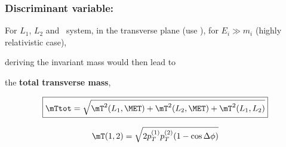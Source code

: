 \begin{frame}
\frametitle{Discriminant variable: \mTtot}
\manip For $L_1$, $L_2$ and \MET\ system,
\submanip in the transverse plane (use \MET),
\submanip for $E_i \gg m_i$ (highly relativistic case),

deriving the \og invariant \fg{} mass would then lead to
\begin{center}
the \textbf{total transverse mass}, \mTtot
\end{center}
\begin{equation*}
\boxed{\mTtot = \sqrt{\mT^2(L_1,\MET) + \mT^2(L_2,\MET) + \mT^2(L_1,L_2)}}
\end{equation*}
\begin{minipage}[c]{.6\textwidth}
\begin{equation*}
\mT(1,2) = \sqrt{2p_T^{(1)} p_T^{(2)} (1-\cos\Delta\phi)}
\end{equation*}
\end{minipage}
\begin{minipage}[c]{.35\textwidth}
\begin{center}
\end{center}
\end{minipage}
\end{frame}
